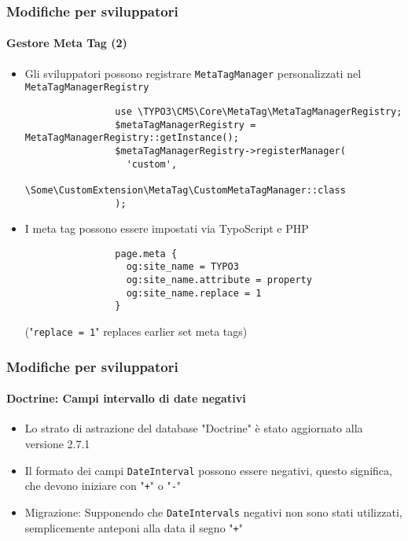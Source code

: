 \begin{frame}[fragile]
	\frametitle{Modifiche per sviluppatori}
	\framesubtitle{Gestore Meta Tag (2)}

	\lstset{basicstyle=\tiny\ttfamily}

	\begin{itemize}
		\item Gli sviluppatori possono registrare \texttt{MetaTagManager} personalizzati nel
			\texttt{MetaTagManagerRegistry}

			\begin{lstlisting}
				use \TYPO3\CMS\Core\MetaTag\MetaTagManagerRegistry;
				$metaTagManagerRegistry = MetaTagManagerRegistry::getInstance();
				$metaTagManagerRegistry->registerManager(
				  'custom',
				  \Some\CustomExtension\MetaTag\CustomMetaTagManager::class
				);
			\end{lstlisting}

		\item I meta tag possono essere impostati via TypoScript e PHP

			\begin{lstlisting}
				page.meta {
				  og:site_name = TYPO3
				  og:site_name.attribute = property
				  og:site_name.replace = 1
				}
			\end{lstlisting}

			\smaller
				("\texttt{replace = 1}" replaces earlier set meta tags)
			\normalsize

	\end{itemize}

\end{frame}


\begin{frame}[fragile]
	\frametitle{Modifiche per sviluppatori}
	\framesubtitle{Doctrine: Campi intervallo di date negativi}

	\begin{itemize}
		\item Lo strato di astrazione del database "Doctrine" è stato aggiornato alla versione 2.7.1
		\item Il formato dei campi \texttt{DateInterval} possono essere negativi, questo significa,
			che devono iniziare con "\texttt{+}" o "\texttt{-}"
		\item Migrazione: Supponendo che \texttt{DateIntervals} negativi non sono stati utilizzati,
			semplicemente anteponi alla data il segno "\texttt{+}"
	\end{itemize}

	\breakingchange

\end{frame}

